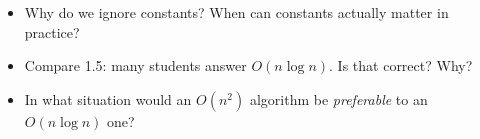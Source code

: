 \documentclass[11pt]{article}
\begin{document}
\begin{disbox}
\begin{itemize}[leftmargin=*]
  \item Why do we ignore constants? When can constants actually matter in practice?
  \item Compare 1.5: many students answer $O(n\log n)$. Is that correct? Why?
  \item In what situation would an $O(n^2)$ algorithm be \emph{preferable} to an $O(n\log n)$ one?
\end{itemize}
\end{disbox}
\end{document}
